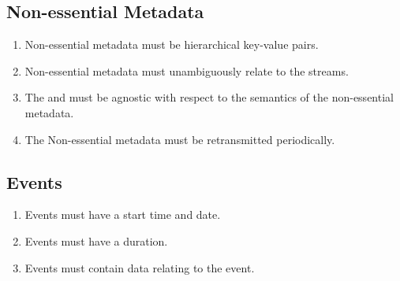 \subsection{Non-essential Metadata} \label{sec:analysis:nonessential}
\begin{enumerate}[ref=R-A-NEM-\arabic* on P.\thepage]
	\item Non-essential metadata must be hierarchical key-value pairs. \label{req:a:nmeta:keyvalue}
	\item Non-essential metadata must unambiguously relate to the streams.\label{req:a:nmeta:relatestream}
	\item The  and  must be agnostic with respect to the semantics of the non-essential metadata.\label{req:a:nmeta:agnosticsemantics}
	\item The Non-essential metadata must be retransmitted periodically.\label{req:a:nmeta:retrnas}
\end{enumerate}

\subsection{Events}\label{sec:analysis:events}
\begin{enumerate}[ref=R-A-E-\arabic* on P.\thepage]
	\item Events must have a start time and date.\label{req:a:event:startdate}
	\item Events must have a duration.\label{req:a:event:duration}
	\item Events must contain data relating to the event.\label{req:a:event:data}
\end{enumerate}

